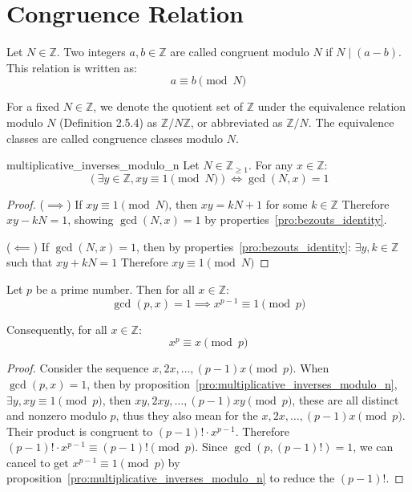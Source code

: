 \section{Congruence Relation}

\begin{definition}
  Let $N \in \mathbb{Z}$. Two integers $a,b \in \mathbb{Z}$ are called congruent modulo $N$ if $N\mid (a-b)$. This relation is written as:
  \[
    a \equiv b \pmod{N}
  \]
\end{definition}

\begin{definition}
  For a fixed $N \in \mathbb{Z}$, we denote the quotient set of $\mathbb{Z}$ under the equivalence relation modulo $N$ (Definition 2.5.4) as $\mathbb{Z}/N\mathbb{Z}$, or abbreviated as $\mathbb{Z}/N$. The equivalence classes are called congruence classes modulo $N$.
\end{definition}

\begin{proposition}{multiplicative_inverses_modulo_n}
  Let $N \in \mathbb{Z}_{\geq 1}$. For any $x \in \mathbb{Z}$:
  \[
    (\exists y \in \mathbb{Z}, xy \equiv 1 \pmod{N}) \iff \gcd(N,x) = 1
  \]
\end{proposition}

\begin{proof}
  ($\implies$) If $xy \equiv 1 \pmod{N}$, then $xy = kN + 1$ for some $k \in \mathbb{Z}$
  Therefore $xy - kN = 1$, showing $\gcd(N,x) = 1$ by properties~\ref{pro:bezouts_identity}.

  ($\impliedby$) If $\gcd(N,x) = 1$, then by properties~\ref{pro:bezouts_identity}:
  $\exists y,k \in \mathbb{Z}$ such that $xy + kN = 1$
  Therefore $xy \equiv 1 \pmod{N}$
\end{proof}

\begin{theorem}
  Let $p$ be a prime number. Then for all $x \in \mathbb{Z}$:
  \[
    \gcd(p,x) = 1 \implies x^{p-1} \equiv 1 \pmod{p}
  \]

  Consequently, for all $x \in \mathbb{Z}$:
  \[
    x^p \equiv x \pmod{p}
  \]
\end{theorem}

\begin{proof}
  Consider the sequence $x, 2x, \ldots, (p-1)x \pmod{p}$.
  When $\gcd(p,x) = 1$, then by proposition~\ref{pro:multiplicative_inverses_modulo_n}, $\exists y,xy \equiv 1\pmod{p}$, then $xy, 2xy, \ldots, (p-1)xy \pmod{p}$, these are all distinct and nonzero modulo $p$, thus they also mean for the $x, 2x, \ldots, (p-1)x \pmod{p}$.
  Their product is congruent to $(p-1)! \cdot x^{p-1}$.
  Therefore $(p-1)! \cdot x^{p-1} \equiv (p-1)! \pmod{p}$.
  Since $\gcd(p,(p-1)!) = 1$, we can cancel to get $x^{p-1} \equiv 1 \pmod{p}$ by proposition~\ref{pro:multiplicative_inverses_modulo_n} to reduce the $(p-1)!$.
\end{proof}

